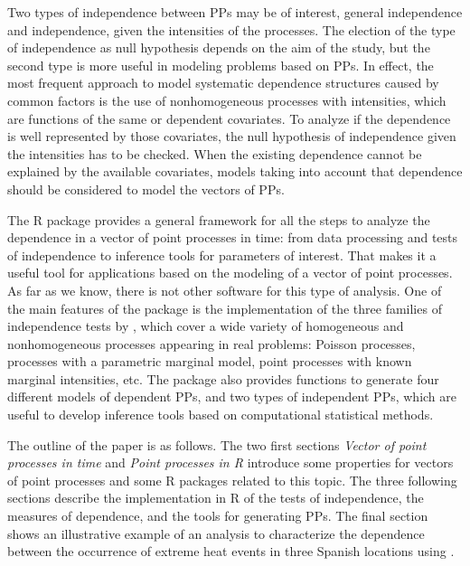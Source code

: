 Two types of independence between PPs  may be of interest,  general independence \citep{Rubin14} and  independence,  given the intensities of the  processes. The election  of the type of independence  as null hypothesis  depends on the aim of the study, but  the second type  is more  useful in  modeling problems based on PPs.  In effect,  the most frequent approach to model  systematic dependence structures caused by common factors  is
the use of nonhomogeneous processes with intensities, which are  functions of   the same or dependent covariates.  To analyze if the dependence is well  represented by those covariates,  the  null hypothesis of independence given the intensities  has to be checked.
When  the existing dependence cannot be explained by the available covariates,   models taking into account that dependence should be considered to model the vectors of PPs.

The R package  \citep{IndTestPP} provides a general framework for  all the steps to analyze the dependence in a vector of point processes in time:  from data  processing and tests of independence to   inference  tools for parameters of interest.   That makes it a useful tool for applications based on the modeling of a vector of point processes. As far as we know, there is  not other software for this type  of analysis. One of the main features  of the package is the implementation of the three families of independence tests by \citet{Cebrian20}, which  cover a wide variety of homogeneous and nonhomogeneous processes appearing in real problems:  Poisson processes, processes with a  parametric marginal model,  point  processes with  known marginal intensities,  etc.  The package also provides functions to generate  four different models of dependent PPs, and two types of independent PPs,  which are  useful to develop inference tools based on computational statistical  methods. 



The outline of the paper is as follows.  The two first sections \textit{Vector of point processes in time} and \textit{Point processes in R} introduce  some properties for vectors of point  processes and some R packages related to this topic.
The three following sections describe the   implementation in R of  the  tests of independence, the measures of dependence, and the tools for generating PPs.  The final section  shows  an  illustrative example of an analysis to  characterize the dependence   between the occurrence of extreme heat events in  three Spanish locations using  . 



